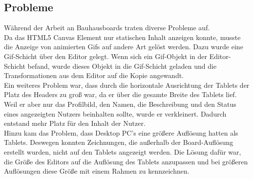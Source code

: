 \subsection{Probleme}\label{Probleme}
Während der Arbeit an Bauhausboards traten diverse Probleme auf.
\\
Da das HTML5 Canvas Element nur statischen Inhalt anzeigen konnte, musste die Anzeige von animierten Gifs auf andere Art gelöst werden.
Dazu wurde eine Gif-Schicht über den Editor gelegt.
Wenn sich ein Gif-Objekt in der Editor-Schicht befand, wurde dieses Objekt in die Gif-Schicht geladen und die Transformationen aus dem Editor auf die Kopie angewandt.
\\
Ein weiteres Problem war, dass durch die horizontale Ausrichtung der Tablets der Platz des Headers zu groß war, da er über die gesamte Breite des Tablets lief.
Weil er aber nur das Profilbild, den Namen, die Beschreibung und den Status eines angezeigten Nutzers beinhalten sollte, wurde er verkleinert.
Dadurch entstand mehr Platz für den Inhalt der Nutzer.
\\
Hinzu kam das Problem, dass Desktop PC's eine größere Auflösung hatten als Tablets.
Deswegen konnten Zeichnungen, die außerhalb der Board-Auflösung erstellt wurden, nicht auf den Tablets angezeigt werden.
Die Lösung dafür war, die Größe des Editors auf die Auflösung des Tablets anzupassen und bei größeren Auflösungen diese Größe mit einem Rahmen zu kennzeichnen.
\\


